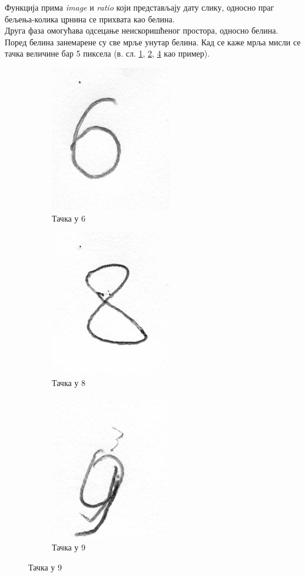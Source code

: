\noindent Функција прима \emph{image} и \emph{ratio} који представљају дату слику, односно праг бељења-колика црнина се прихвата као белина.  
\\ \indent Друга фаза омогућава одсецање неискоришћеног простора, односно белина. Поред белина занемарене су све мрље унутар белина. Кад се каже мрља мисли се тачка величине бар 5 пиксела (в. сл. \ref{pic:dot6}, \ref{pic:dot8}, \ref{pic:dot9} као пример). 
\begin{figure}[htb!]\caption{Тачке}
\begin{subfigure}{.3\textwidth}
\centering
\includegraphics[width=.4\linewidth]{pictures/1/Dot6}
\caption{Тачка у 6}\label{pic:dot6}
\end{subfigure}
\begin{subfigure}{.3\textwidth}
\centering
\includegraphics[width=.4\linewidth]{pictures/1/Dot8}
\caption{Тачка у 8}\label{pic:dot8}
\end{subfigure}
\begin{subfigure}{.3\textwidth}
\centering
\includegraphics[width=.4\linewidth]{pictures/1/Dot9}
\caption{Тачка у 9}\label{pic:dot9}
\end{subfigure}
\end{figure}

